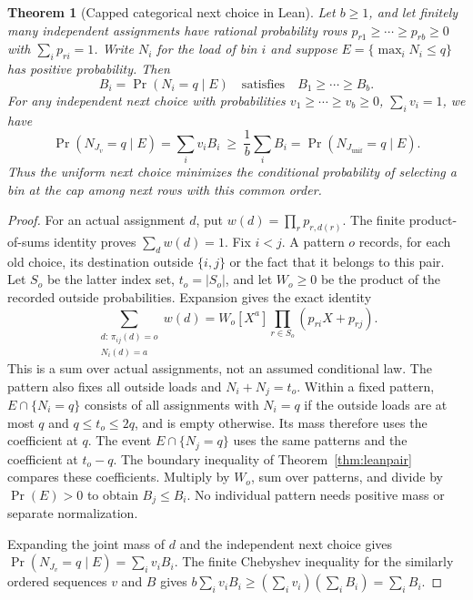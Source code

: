 \documentclass[11pt]{article}
\newtheorem{theorem}{Theorem}
\begin{document}
\begin{theorem}[Capped categorical next choice in Lean]\label{thm:leancategorical}
Let $b\geq1$, and let finitely many independent assignments have rational
probability rows $p_{r1}\geq\cdots\geq p_{rb}\geq0$ with
$\sum_i p_{ri}=1$. Write $N_i$ for the load of bin $i$ and suppose
$E=\{\max_i N_i\leq q\}$ has positive probability. Then
\[
 B_i=\Pr(N_i=q\mid E)\quad\text{satisfies}\quad
 B_1\geq\cdots\geq B_b.
\]
For any independent next choice with probabilities
$v_1\geq\cdots\geq v_b\geq0$, $\sum_i v_i=1$, we have
\[
 \Pr(N_{J_v}=q\mid E)=\sum_i v_iB_i
 \ \geq\ \frac1b\sum_i B_i
 =\Pr(N_{J_{\mathrm{unif}}}=q\mid E).
\]
Thus the uniform next choice minimizes the conditional probability of
selecting a bin at the cap among next rows with this common order.
\end{theorem}
\begin{proof}
For an actual assignment $d$, put $w(d)=\prod_r p_{r,d(r)}$.
The finite product-of-sums identity proves $\sum_d w(d)=1$.
Fix $i<j$. A pattern $o$ records, for each old choice, its destination
outside $\{i,j\}$ or the fact that it belongs to this pair. Let $S_o$
be the latter index set, $t_o=|S_o|$, and let $W_o\geq0$ be the product
of the recorded outside probabilities. Expansion gives the exact identity
\[
 \sum_{\substack{d:\,\pi_{ij}(d)=o\\N_i(d)=a}}w(d)
 =W_o[X^a]\prod_{r\in S_o}(p_{ri}X+p_{rj}).
\]
This is a sum over actual assignments, not an assumed conditional law.
The pattern also fixes all outside loads and $N_i+N_j=t_o$.
Within a fixed pattern, $E\cap\{N_i=q\}$ consists of all assignments
with $N_i=q$ if the outside loads are at most $q$ and
$q\leq t_o\leq2q$, and is empty otherwise. Its mass therefore uses the
coefficient at $q$. The event $E\cap\{N_j=q\}$ uses the same patterns and
the coefficient at $t_o-q$. The boundary inequality of
Theorem~\ref{thm:leanpair} compares these coefficients. Multiply by $W_o$,
sum over patterns, and divide by $\Pr(E)>0$ to obtain $B_j\leq B_i$.
No individual pattern needs positive mass or separate normalization.

Expanding the joint mass of $d$ and the independent next choice gives
$\Pr(N_{J_v}=q\mid E)=\sum_i v_iB_i$. The finite Chebyshev inequality
for the similarly ordered sequences $v$ and $B$ gives
$b\sum_i v_iB_i\geq(\sum_i v_i)(\sum_i B_i)=\sum_i B_i$.


\end{proof}
\end{document}
